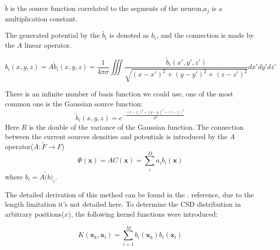 \documentclass[12pt,a4paper]{article}
\begin{document}
$\tilde{b}$ is the source function correlated to the segments of the neuron,$a_j$ is a multiplication constant.





The generated potential by the $\tilde{b_i}$ is denoted as  $b_i$, and the connection is made by the $A$ linear operator.

\begin{equation}
\label{eq:bfun}
b_i (x,y,z)= A \tilde{b}_i (x,y,z)= \frac{1}{4 \pi \sigma} \iiint 
\frac{ \tilde{b}_i (x',y',z')}{\sqrt{(x-x')^2+(y-y')^2+(z-z')^2}} dx' dy' dz'
\end{equation}

There is an infinite number of basis function we could use, one of the most common one is the Gaussian source function:
\begin{equation}
\label{eq:basisfun}
\tilde{b}_i (x,y,z) = e^{- \frac{(x-x_i)^2+(y-y_i)^2+(z-z_i)^2}{R^2}}
\end{equation}
Here $R$ is the double of the variance of the Gaussian function. The connection between the current sources densities and potentials is introduced by the $A$ operator($A: \tilde{F}\rightarrow F$)
\begin{equation}
\Phi(\textbf{x})= A C(\textbf{x}) =  \sum_{i}^M a_i b_i (\textbf{x})
\end{equation}
 where $b_i = A \tilde(b)_i$.
 
 
 
 
 
The detailed derivation of this method can be found in the \cite{DanielW}. reference, due to the length limitation it's not detailed here.
To determine the CSD distribution in arbitrary positions($x$), the following kernel functions were introduced:

\begin{equation}
K(\textbf{x}_k,\textbf{x}_l)= \sum_{i=1}^M b_i (\textbf{x}_k) b_i (\textbf{x}_l)
\end{equation} 
 
\end{document}
